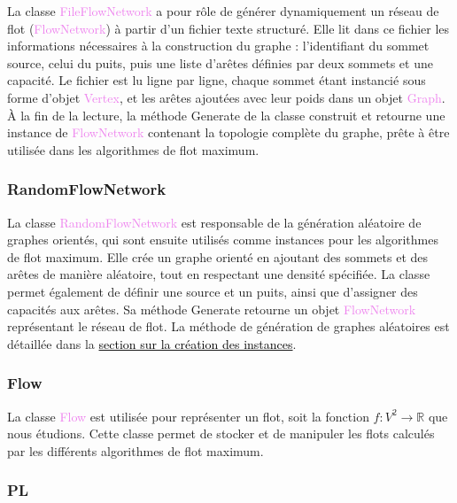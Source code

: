 \documentclass[a4paper]{article}
\begin{document}
La classe \textcolor{violet}{FileFlowNetwork} a pour rôle de générer dynamiquement un réseau de flot (\textcolor{violet}{FlowNetwork}) à partir d’un fichier texte structuré. Elle lit dans ce fichier les informations nécessaires à la construction du graphe : l'identifiant du sommet source, celui du puits, puis une liste d’arêtes définies par deux sommets et une capacité. Le fichier est lu ligne par ligne, chaque sommet étant instancié sous forme d’objet \textcolor{violet}{Vertex}, et les arêtes ajoutées avec leur poids dans un objet \textcolor{violet}{Graph}. À la fin de la lecture, la méthode \textcolor{green!60!black}{Generate} de la classe construit et retourne une instance de \textcolor{violet}{FlowNetwork} contenant la topologie complète du graphe, prête à être utilisée dans les algorithmes de flot maximum.

\subsubsection{RandomFlowNetwork}
La classe \textcolor{violet}{RandomFlowNetwork} est responsable de la génération aléatoire de graphes orientés, qui sont ensuite utilisés comme instances pour les algorithmes de flot maximum. Elle crée un graphe orienté en ajoutant des sommets et des arêtes de manière aléatoire, tout en respectant une densité spécifiée. La classe permet également de définir une source et un puits, ainsi que d'assigner des capacités aux arêtes. Sa méthode \textcolor{green!60!black}{Generate} retourne un objet \textcolor{violet}{FlowNetwork} représentant le réseau de flot. La méthode de génération de graphes aléatoires est détaillée dans la \hyperref[sec:creer_instances]{\textcolor{black}{section sur la création des instances}}.

\subsubsection{Flow}

La classe \textcolor{violet}{Flow} est utilisée pour représenter un flot, soit la fonction $f : V^2 \to \mathbb{R}$ que nous étudions. Cette classe permet de stocker et de manipuler les flots calculés par les différents algorithmes de flot maximum.

\subsubsection{PL}
\end{document}
